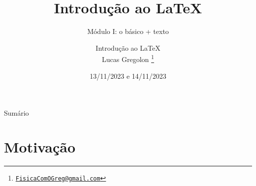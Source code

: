 \documentclass[c]{beamer}
\title{
    {\sc Introdução ao \LaTeX}
    }
\subtitle{Módulo I: o básico + texto}
\date{13/11/2023 e 14/11/2023}
\author{
    {\large Introdução ao \LaTeX}\\[0.3cm]
	Lucas {\sc Gregolon} \inst{1}
	\footnote{\href{FisicaComOGreg@gmail.com}{\texttt{FisicaComOGreg@gmail.com}}}
	}
\institute{
    {\inst{1} \large Instituto de Matemática, Estatística e Física - IMEF/FURG}\\[0.2cm]
    }
\begin{document}
\maketitle

{
\fontsize{9pt}{10.0}\selectfont

\begin{frame}[fragile]{\sc Sumário}
    
	\begin{multicols}{2}
	    \tableofcontents
	\end{multicols}
	
\end{frame}
}

{
\fontsize{10pt}{10.0}\selectfont

\section{Motivação}
    
}
\end{document}

